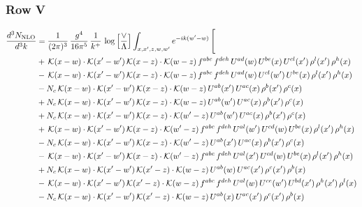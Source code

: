 \documentclass[9pt]{article}
\numberwithin{equation}{section}
\begin{document}
\subsubsection{Row V}
\begin{align}
\frac{d^{3}N_{\mathrm{NLO}}}{d^{3}k} & = \frac{1}{(2\pi)^{3}}\,\frac{g^{4}}{16\pi^{5}}\,\frac{1}{k^{+}}\,\log\Big[\frac{\vee}{\Lambda}\Big]\int_{x,x',z,w,w'}e^{-ik(w'-w)}\,\Bigg[\notag\\ &  +\,\mathcal{K}(x-w)\cdot\mathcal{K}(x'-w')\,\mathcal{K}(x-z)\cdot\mathcal{K}(w-z)\,f^{abc}\,f^{deh}\,U^{ad}(w)\,U^{be}(x)\,U^{cl}(x')\,\rho^{l}(x')\,\rho^{h}(x)\notag\\
& -\,\mathcal{K}(x-w)\cdot\mathcal{K}(x'-w')\,\mathcal{K}(x-z)\cdot\mathcal{K}(w-z)\,f^{abc}\,f^{deh}\,U^{ad}(w)\,U^{cl}(w')\,U^{be}(x)\,\rho^{l}(x')\,\rho^{h}(x)\notag\\
& -N_{c}\,\mathcal{K}(x-w)\cdot\mathcal{K}(x'-w')\,\mathcal{K}(x-z)\cdot\mathcal{K}(w-z)\,U^{ab}(x')\,U^{ac}(x)\,\rho^{b}(x')\,\rho^{c}(x)\notag\\
& +N_{c}\,\mathcal{K}(x-w)\cdot\mathcal{K}(x'-w')\,\mathcal{K}(x-z)\cdot\mathcal{K}(w-z)\,U^{ab}(w')\,U^{ac}(x)\,\rho^{b}(x')\,\rho^{c}(x)\notag\\
& +N_{c}\,\mathcal{K}(x-w)\cdot\mathcal{K}(x'-w')\,\mathcal{K}(x-z)\cdot\mathcal{K}(w'-z)\,U^{ab}(w')\,U^{ac}(x)\,\rho^{b}(x')\,\rho^{c}(x)\notag\\
& +\,\mathcal{K}(x-w)\cdot\mathcal{K}(x'-w')\,\mathcal{K}(x-z)\cdot\mathcal{K}(w'-z)\,f^{abc}\,f^{deh}\,U^{al}(w')\,U^{cd}(w)\,U^{be}(x)\,\rho^{l}(x')\,\rho^{h}(x)\notag\\
& -N_{c}\,\mathcal{K}(x-w)\cdot\mathcal{K}(x'-w')\,\mathcal{K}(x-z)\cdot\mathcal{K}(w'-z)\,U^{ab}(x')\,U^{ac}(x)\,\rho^{b}(x')\,\rho^{c}(x)\notag\\
& -\,\mathcal{K}(x-w)\cdot\mathcal{K}(x'-w')\,\mathcal{K}(x-z)\cdot\mathcal{K}(w'-z)\,f^{abc}\,f^{deh}\,U^{al}(x')\,U^{cd}(w)\,U^{be}(x)\,\rho^{l}(x')\,\rho^{h}(x)\notag\\
& +N_{c}\,\mathcal{K}(x-w)\cdot\mathcal{K}(x'-w')\,\mathcal{K}(x'-z)\cdot\mathcal{K}(w-z)\,U^{ab}(w)\,U^{ac}(x')\,\rho^{c}(x')\,\rho^{b}(x)\notag\\
& -\,\mathcal{K}(x-w)\cdot\mathcal{K}(x'-w')\,\mathcal{K}(x'-z)\cdot\mathcal{K}(w-z)\,f^{abc}\,f^{deh}\,U^{al}(w)\,U^{ce}(w')\,U^{bd}(x')\,\rho^{h}(x')\,\rho^{l}(x)\notag\\
& -N_{c}\,\mathcal{K}(x-w)\cdot\mathcal{K}(x'-w')\,\mathcal{K}(x'-z)\cdot\mathcal{K}(w-z)\,U^{ab}(x)\,U^{ac}(x')\,\rho^{c}(x')\,\rho^{b}(x)\notag\\

\end{align}
\end{document}
